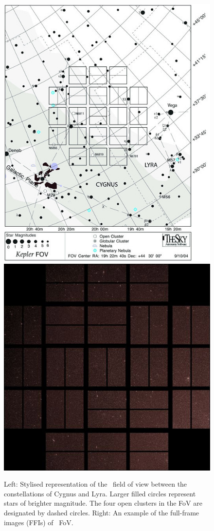 \begin{figure}[htbp]
    \centering
    \includegraphics[height=0.32\paperheight]{Chapter1/kepFoV.jpg}
    \vspace{0.5em}
    \includegraphics[width=0.45\linewidth]{Chapter1/kepFFI.jpg}
    \caption[\Kepler field of view; stylised, and full-frame image]{Left: Stylised representation of the \Kepler\, field of view between the constellations of Cygnus and Lyra. Larger filled circles represent stars of brighter magnitude. The four open clusters in the FoV are designated by dashed circles. Right: An example of the full-frame images (FFIs) of \Keplers~FoV.}
    \label{fig:kepFoV}
\end{figure}


